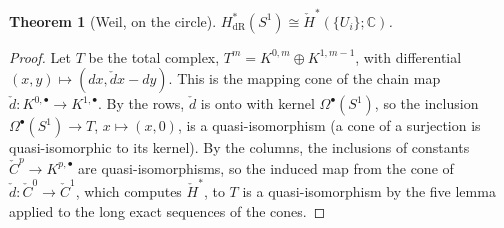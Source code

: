 \documentclass[11pt,oneside,reqno]{article}
\newcommand{\C}{\mathbb C}
\newcommand{\Om}{\Omega}
\theoremstyle{plain}
\newtheorem{theorem}{Theorem}[section]
\theoremstyle{definition}
\theoremstyle{remark}
\begin{document}
\begin{theorem}[Weil, on the circle]\label{thm:weilS1}
\(H^*_{\mathrm{dR}}(S^1)\cong\check H^*(\{U_i\};\C)\).
\end{theorem}

\begin{proof}
Let \(T\) be the total complex, \(T^m=K^{0,m}\oplus K^{1,m-1}\), with differential
\((x,y)\mapsto(dx,\check d x-dy)\). This is the mapping cone of the chain map
\(\check d:K^{0,\bullet}\to K^{1,\bullet}\). By the rows, \(\check d\) is onto with kernel \(\Om^\bullet(S^1)\), so the
inclusion \(\Om^\bullet(S^1)\to T\), \(x\mapsto(x,0)\), is a quasi-isomorphism (a cone of a surjection is
quasi-isomorphic to its kernel). By the columns, the inclusions of constants
\(\check C^p\to K^{p,\bullet}\) are quasi-isomorphisms, so the induced map from the cone of
\(\check d:\check C^0\to\check C^1\), which computes \(\check H^*\), to \(T\) is a quasi-isomorphism by the five lemma
applied to the long exact sequences of the cones.
\end{proof}
\end{document}
